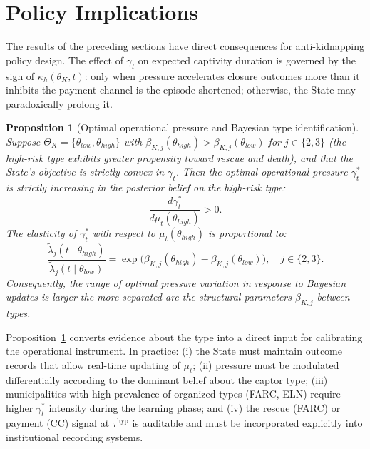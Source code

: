 \documentclass[12pt]{article}
\newtheorem{proposition}[theorem]{Proposition}
\theoremstyle{definition}
\theoremstyle{remark}
\newcommand{\1}{\mathbf{1}}
\begin{document}
\section{Policy Implications}
\label{sec:policy}

\noindent The results of the preceding sections have direct consequences for anti-kidnapping policy design. The effect of $\gamma_t$ on expected captivity duration is governed by the sign of $\kappa_h(\theta_K,t)$: only when pressure accelerates closure outcomes more than it inhibits the payment channel is the episode shortened; otherwise, the State may paradoxically prolong it.

\begin{proposition}[Optimal operational pressure and Bayesian type identification]
\label{prop:optimal-gamma-beliefs}
Suppose $\Theta_K=\{\theta_{low},\theta_{high}\}$ with $\beta_{K,j}(\theta_{high})>\beta_{K,j}(\theta_{low})$ for $j\in\{2,3\}$ (the high-risk type exhibits greater propensity toward rescue and death), and that the State's objective is strictly convex in $\gamma_t$. Then the optimal operational pressure $\gamma_t^\ast$ is strictly increasing in the posterior belief on the high-risk type:
\[
\frac{d\gamma_t^\ast}{d\mu_t(\theta_{high})} > 0.
\]
The elasticity of $\gamma_t^\ast$ with respect to $\mu_t(\theta_{high})$ is proportional to:
\[
\frac{\tilde\lambda_j(t\mid\theta_{high})}{\tilde\lambda_j(t\mid\theta_{low})}
= \exp\!\bigl(\beta_{K,j}(\theta_{high})-\beta_{K,j}(\theta_{low})\bigr), \quad j\in\{2,3\}.
\]
Consequently, the range of optimal pressure variation in response to Bayesian updates is larger the more separated are the structural parameters $\beta_{K,j}$ between types.
\end{proposition}

Proposition~\ref{prop:optimal-gamma-beliefs} converts evidence about the type into a direct input for calibrating the operational instrument. In practice: (i) the State must maintain outcome records that allow real-time updating of $\mu_t$; (ii) pressure must be modulated differentially according to the dominant belief about the captor type; (iii) municipalities with high prevalence of organized types (FARC, ELN) require higher $\gamma_t^\ast$ intensity during the learning phase; and (iv) the rescue (FARC) or payment (CC) signal at $\tau^{\mathrm{hyp}}$ is auditable and must be incorporated explicitly into institutional recording systems.
\end{document}
